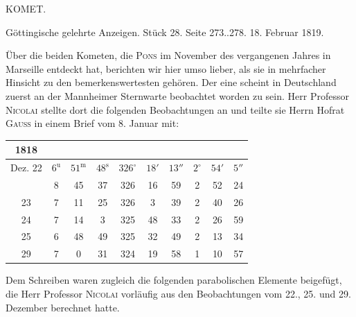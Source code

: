 \clearpage
{}
\begin{center}
\Large KOMET.

\medskip
Göttingische gelehrte Anzeigen. Stück 28. Seite 273..278. 18. Februar 1819.
\end{center}

\par\indent Über die beiden Kometen, die \textsc{Pons} im November des vergangenen Jahres in Marseille entdeckt hat, berichten wir hier umso lieber, als sie in mehrfacher Hinsicht zu den bemerkenswertesten gehören. Der eine scheint in Deutschland zuerst an der Mannheimer Sternwarte beobachtet worden zu sein. Herr Professor \textsc{Nicolai} stellte dort die folgenden Beobachtungen an und teilte sie Herrn Hofrat \textsc{Gauss} in einem Brief vom 8. Januar mit:

\begin{center}
\setlength{\tabcolsep}{2.2pt}\begin{tabular}{c|ccc|ccc|ccc}
1818 &  &  &  \\
\hline
Dez. 22 & $6^{\mathrm u}$ & $51^{\mathrm m}$ & $48^{\mathrm s}$ & $326^\circ$ & $18'$ & $13''$ & $2^\circ$ & $54'$ & $5''$ \\
        & 8     & 45     & 37     & 326         & 16    & 59     & 2         & 52    & 24    \\
     23 & 7     & 11     & 25     & 326         & 3     & 39     & 2         & 40    & 26    \\
     24 & 7     & 14     & 3      & 325         & 48    & 33     & 2         & 26    & 59    \\
     25 & 6     & 48     & 49     & 325         & 32    & 49     & 2         & 13    & 34    \\
     29 & 7     & 0      & 31     & 324         & 19    & 58     & 1         & 10    & 57    \\
\end{tabular}
\end{center}

\par\indent Dem Schreiben waren zugleich die folgenden parabolischen Elemente beigefügt, die Herr Professor \textsc{Nicolai} vorläufig aus den Beobachtungen vom 22., 25. und 29. Dezember berechnet hatte.

